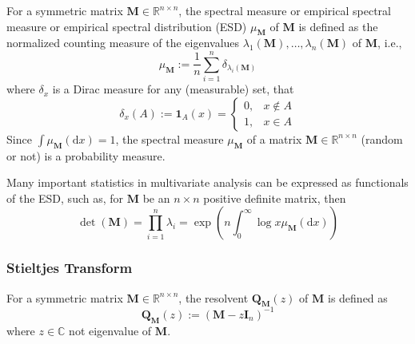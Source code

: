 \begin{definition}
    For a symmetric matrix $\mathbf{M}\in\mathbb{R}^{n\times n}$, the spectral measure or empirical spectral measure or empirical spectral distribution (ESD) $\mu_{\mathbf{M}}$ of $\mathbf{M}$ is defined as the normalized counting measure of the eigenvalues $\lambda_{1}(\mathbf{M}),\ldots,\lambda_{n}(\mathbf{M})$ of $\mathbf{M}$, i.e.,
    \begin{equation}
        \mu_{\mathbf{M}}:=\frac{1}{n}\sum_{i=1}^{n}\delta_{\lambda_{i}(\mathbf{M})}
    \end{equation}
    where $\delta_{x}$ is a Dirac measure for any (measurable) set, that
    \begin{equation*}
        \delta_{x}(A):=\mathbf{1}_{A}(x)=
        \begin{cases}
            0, & x\notin A \\
            1, & x\in A
        \end{cases}
    \end{equation*}
    Since $\int\mu_{\mathbf{M}}\left(\mathrm{d}x\right)=1$, the spectral measure $\mu_{\mathbf{M}}$ of a matrix $\mathbf{M}\in\mathbb{R}^{n\times n}$ (random or not) is a probability measure.
\end{definition}

\begin{remark}
    Many important statistics in multivariate analysis can be expressed as functionals of the ESD, such as, for $\mathbf{M}$ be an $n\times n$ positive definite matrix, then
    \begin{equation}
        \operatorname{det}(\mathbf{M})=\prod_{i=1}^{n}\lambda_{i}=\exp\left(n\int_{0}^{\infty}\log x\mu_{\mathbf{M}}(\mathrm{d}x)\right)
    \end{equation}
\end{remark}

\subsubsection{Stieltjes Transform}

\begin{definition}[Resolvent]
    For a symmetric matrix $\mathbf{M}\in\mathbb{R}^{n\times n}$, the resolvent $\mathbf{Q}_{\mathbf{M}}(z)$ of $\mathbf{M}$ is defined as
    \begin{equation}
        \mathbf{Q}_{\mathbf{M}}(z):=\left(\mathbf{M}-z\mathbf{I}_{n}\right)^{-1}
    \end{equation}
    where $z\in\mathbb{C}$ not eigenvalue of $\mathbf{M}$.
\end{definition}

